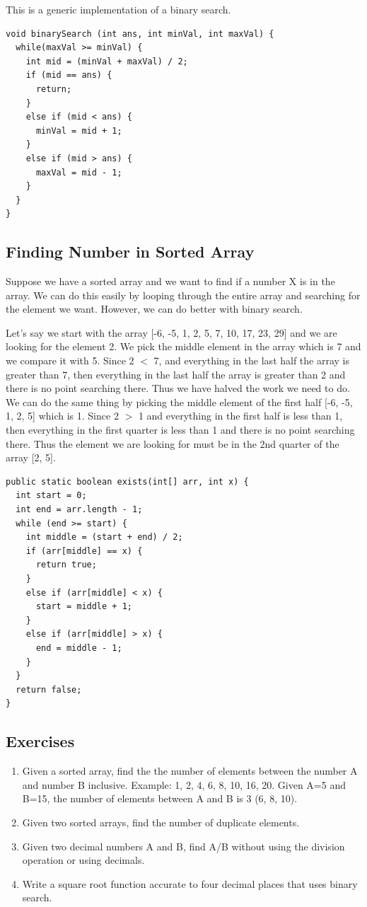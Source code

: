 \documentclass[11pt,oneside]{book}
\begin{document}
This is a generic implementation of a binary search.

\begin{lstlisting}
void binarySearch (int ans, int minVal, int maxVal) {
  while(maxVal >= minVal) {
    int mid = (minVal + maxVal) / 2;
    if (mid == ans) {
      return;
    }
    else if (mid < ans) {
      minVal = mid + 1;
    } 
    else if (mid > ans) {
      maxVal = mid - 1;
    }
  }
}
\end{lstlisting}

\subsection{Finding Number in Sorted Array}

Suppose we have a sorted array and we want to find if a number X is in the array. We can do this easily by looping through the entire array and searching for the element we want. However, we can do better with binary search.

Let's say we start with the array [-6, -5, 1, 2, 5, 7, 10, 17, 23, 29] and we are looking for the element 2. We pick the middle element in the array which is 7 and we compare it with 5. Since 2 $<$ 7, and everything in the last half the array is greater than 7, then everything in the last half the array is greater than 2 and there is no point searching there. Thus we have halved the work we need to do. We can do the same thing by picking the middle element of the first half [-6, -5, 1, 2, 5] which is 1. Since 2 $>$ 1 and everything in the first half is less than 1, then everything in the first quarter is less than 1 and there is no point searching there. Thus the element we are looking for must be in the 2nd quarter of the array [2, 5].

\begin{lstlisting}
public static boolean exists(int[] arr, int x) {
  int start = 0;
  int end = arr.length - 1;
  while (end >= start) {
    int middle = (start + end) / 2;
    if (arr[middle] == x) {
      return true;
    }
    else if (arr[middle] < x) {
      start = middle + 1;
    }
    else if (arr[middle] > x) {
      end = middle - 1;
    }
  }
  return false;
}
\end{lstlisting}

\subsection{Exercises}

\begin{enumerate}
\item Given a sorted array, find the the number of elements between the number A and number B inclusive.
Example: 1, 2, 4, 6, 8, 10, 16, 20. Given A=5 and B=15, the number of elements between A and B is 3 (6, 8, 10).
\item Given two sorted arrays, find the number of duplicate elements.
\item Given two decimal numbers A and B, find A/B without using the division operation or using decimals.
\item Write a square root function accurate to four decimal places that uses binary search.
\end{enumerate}
\end{document}
